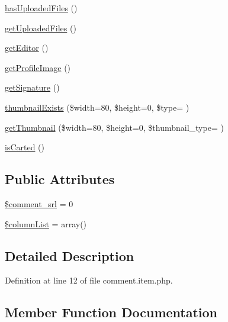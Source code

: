 \begin{DoxyCompactItemize}
\hyperlink{classcommentItem_abe1774ffe4e8c0f5c14822c5698433da}{has\+Uploaded\+Files} ()
\item 
\hyperlink{classcommentItem_aaa9c1ef5cfd0ce69fd83d8d980360ee5}{get\+Uploaded\+Files} ()
\item 
\hyperlink{classcommentItem_aa27b1c1916b9df510c495655af07bfdf}{get\+Editor} ()
\item 
\hyperlink{classcommentItem_a9baa56f4aa9515c433494778e75c9e85}{get\+Profile\+Image} ()
\item 
\hyperlink{classcommentItem_a97eea3e5359c0ffe84db781d5e5fbff6}{get\+Signature} ()
\item 
\hyperlink{classcommentItem_a1523ec4128cf464d13ca1fb1c2078a0f}{thumbnail\+Exists} (\$width=80, \$height=0, \$type= \textquotesingle{}\textquotesingle{})
\item 
\hyperlink{classcommentItem_a9ba96d0703304547c3f494403a86e522}{get\+Thumbnail} (\$width=80, \$height=0, \$thumbnail\+\_\+type= \textquotesingle{}\textquotesingle{})
\item 
\hyperlink{classcommentItem_aee548a05480bd060de454017aa8be318}{is\+Carted} ()
\end{DoxyCompactItemize}
\subsection*{Public Attributes}
\begin{DoxyCompactItemize}
\item 
\hyperlink{classcommentItem_aec6b057a6e1e71a7b1441fe12682af3b}{\$comment\+\_\+srl} = 0
\item 
\hyperlink{classcommentItem_ad9849e9711f1458b25cf7775336bd6cd}{\$column\+List} = array()
\end{DoxyCompactItemize}


\subsection{Detailed Description}


Definition at line 12 of file comment.\+item.\+php.



\subsection{Member Function Documentation}
\hypertarget{classcommentItem_a0c2c15c69b3584aadf79446147752d80}{}
